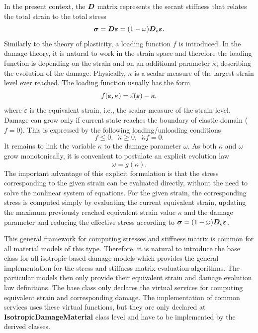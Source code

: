 \documentclass[a4paper]{article}
\newcommand{\class}[1]{{\bf #1}}
\newcommand{\mbf}[1]{\mbox{\boldmath$#1$}}
\begin{document}
 In the present context, the $\mbf{D}$ matrix represents the secant
 stiffness that relates the total strain to the total stress
 $$
 \mbf{\sigma}=\mbf{D}\mbf{\varepsilon} = (1-\omega)\mbf{D}_e\mbf{\varepsilon}.
 $$
 Similarly to the theory of plasticity, a loading function $f$ is
 introduced. In the damage theory, it is natural to work in the strain
 space and therefore the loading function is depending on the strain
 and on an additional parameter $\kappa$, describing the evolution of
 the damage. Physically, $\kappa$ is a scalar measure of the
 largest strain level ever reached. The loading function usually has
 the form
 $$
 f(\mbf{\varepsilon}, \kappa) = \tilde\varepsilon(\mbf{\varepsilon}) - \kappa,
 $$
 where $\tilde\varepsilon$ is the equivalent strain, i.e., the scalar
 measure of the strain level.
 Damage can grow only if current state reaches the boundary of elastic
 domain ($f=0$). This is expressed by the following loading/unloading
 conditions
 $$
 f \le 0,\;\;\dot\kappa \ge0,\;\;\dot\kappa f = 0.
 $$ 
 It remains to link the variable $\kappa$ to the damage parameter
 $\omega$. As both $\kappa$ and $\omega$ grow monotonically, it is
 convenient to postulate an explicit evolution law
 $$
 \omega = g(\kappa).
 $$
 The important advantage of this explicit formulation is that the
 stress corresponding to the given strain can be evaluated directly,
 without the need to solve the nonlinear system of equations.
 For the given strain, the corresponding stress is computed simply by
 evaluating the current equivalent strain, updating the maximum
 previously reached equivalent strain value $\kappa$  and the damage
 parameter and reducing the effective stress according to $\mbf{\sigma}
 = (1-\omega)\mbf{D}_e \mbf{\varepsilon}$.

 This general framework for computing stresses and
 stiffness matrix is  common for all material models of this type.
 Therefore, it is natural to introduce
 the base class for all isotropic-based damage models which provides the general
 implementation for the stress and stiffness matrix evaluation
 algorithms. The particular models then only provide their equivalent
 strain and damage evolution law definitions.
 The base class only declares the virtual services for computing equivalent
 strain and corresponding damage. The implementation of common services
 uses these virtual functions, but they are only declared at
 \class{IsotropicDamageMaterial} class level and have to be
 implemented by the derived classes.
\end{document}
